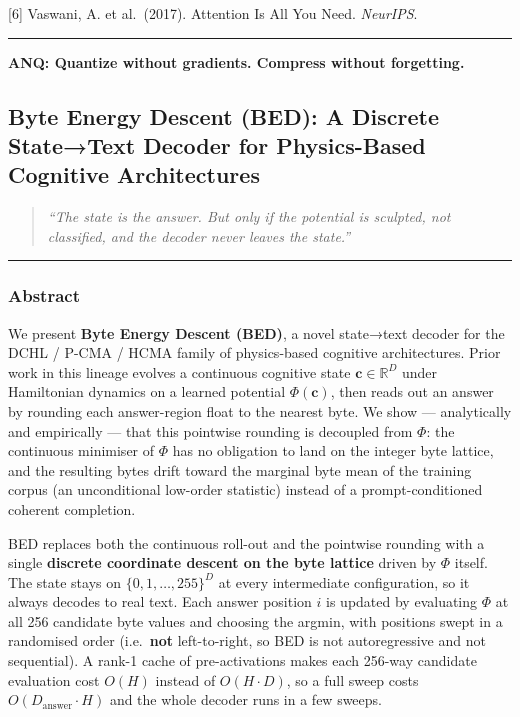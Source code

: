 \documentclass[
  11pt,
  a4paper,
]{article}
\begin{document}
{[}6{]} Vaswani, A. et al.~(2017). Attention Is All You Need.
\emph{NeurIPS}.

\begin{center}\rule{0.5\linewidth}{0.5pt}\end{center}

\textbf{ANQ: Quantize without gradients. Compress without forgetting.}

\newpage

\subsection{Byte Energy Descent (BED): A Discrete State→Text Decoder for
Physics-Based Cognitive
Architectures}\label{byte-energy-descent-bed-a-discrete-statetext-decoder-for-physics-based-cognitive-architectures}

\begin{quote}
\emph{``The state is the answer. But only if the potential is sculpted,
not classified, and the decoder never leaves the state.''}
\end{quote}

\begin{center}\rule{0.5\linewidth}{0.5pt}\end{center}

\subsubsection{Abstract}\label{abstract-1}

We present \textbf{Byte Energy Descent (BED)}, a novel state→text
decoder for the DCHL / P-CMA / HCMA family of physics-based cognitive
architectures. Prior work in this lineage evolves a continuous cognitive
state \(\mathbf{c} \in \mathbb{R}^D\) under Hamiltonian dynamics on a
learned potential \(\Phi(\mathbf{c})\), then reads out an answer by
rounding each answer-region float to the nearest byte. We show ---
analytically and empirically --- that this pointwise rounding is
decoupled from \(\Phi\): the continuous minimiser of \(\Phi\) has no
obligation to land on the integer byte lattice, and the resulting bytes
drift toward the marginal byte mean of the training corpus (an
unconditional low-order statistic) instead of a prompt-conditioned
coherent completion.

BED replaces both the continuous roll-out and the pointwise rounding
with a single \textbf{discrete coordinate descent on the byte lattice}
driven by \(\Phi\) itself. The state stays on \(\{0,1,\dots,255\}^D\) at
every intermediate configuration, so it always decodes to real text.
Each answer position \(i\) is updated by evaluating \(\Phi\) at all 256
candidate byte values and choosing the argmin, with positions swept in a
randomised order (i.e.~\textbf{not} left-to-right, so BED is not
autoregressive and not sequential). A rank-1 cache of pre-activations
makes each 256-way candidate evaluation cost \(O(H)\) instead of
\(O(H \cdot D)\), so a full sweep costs \(O(D_{\text{answer}} \cdot H)\)
and the whole decoder runs in a few sweeps.
\end{document}
